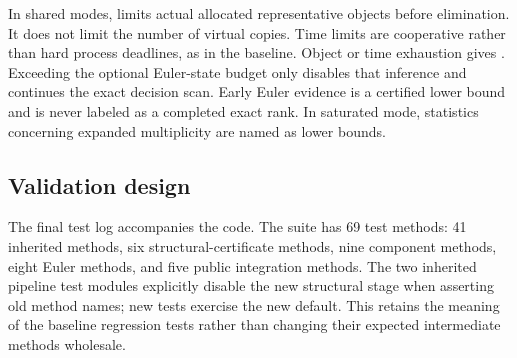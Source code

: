 In shared modes,  limits actual allocated representative
objects before elimination. It does not limit the number of virtual copies.
Time limits are cooperative rather than hard process deadlines, as in the
baseline. Object or time exhaustion gives \UNKNOWN. Exceeding the optional
Euler-state budget only disables that inference and continues the exact
decision scan. Early Euler evidence is a certified lower bound and is never
labeled as a completed exact rank. In saturated mode, statistics concerning
expanded multiplicity are named as lower bounds.

\subsection{Validation design}
The final test log accompanies the code. The suite has 69 test methods:
41 inherited methods, six structural-certificate methods, nine component
methods, eight Euler methods, and five public integration methods. The two
inherited pipeline test modules explicitly disable the new structural stage
when asserting old method names; new tests exercise the new default. This
retains the meaning of the baseline regression tests rather than changing
their expected intermediate methods wholesale.

